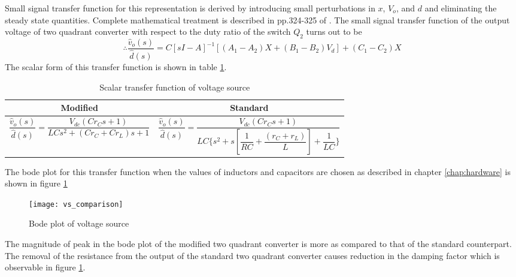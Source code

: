 	Small signal transfer function for this representation is derived by introducing small perturbations in $x$, $V_o$, and $d$ and eliminating the steady state quantities. Complete mathematical treatment is described in pp.324-325 of \citet{book:768263}. The small signal transfer function of the output voltage of two quadrant converter with respect to the duty ratio of the switch $Q_2$ turns out to be \cite{book:768263}
	\begin{equation}
		\therefore \dfrac{\hat{v}_o(s)}{\hat{d}(s)} = C[sI-A]^{-1}[(A_1-A_2)X+(B_1-B_2)V_d]+(C_1-C_2)X
		\label{eq:mod27a}
	\end{equation}
	The scalar form of this transfer function is shown in table \ref{tab:vstf}.
	\begin{table}[h]
	\centering
	\begin{tabular}{|p{6cm}|p{8cm}|} \hline
	\multicolumn{1}{|c|}{Modified} & \multicolumn{1}{c|}{Standard} \\ \hline
	\vspace{-2mm} \(\displaystyle \dfrac{\hat{v}_o(s)}{\hat{d}(s)} = \dfrac{V_{dc}(Cr_Cs+1)}{LCs^2+(Cr_C+Cr_L)s+1} \) & \vspace{-2mm} \(\displaystyle \dfrac{\hat{v}_o(s)}{\hat{d}(s)} = \dfrac{V_{dc}(Cr_Cs+1)}{LC\{s^2+s\left[\dfrac{1}{RC} + \dfrac{(r_C + r_L)}{L} \right]+\dfrac{1}{LC}\}}\) \vspace{1mm} \\ \hline
	\end{tabular}
	\caption{Scalar transfer function of voltage source}
	\label{tab:vstf}
	\end{table}
	
	The bode plot for this transfer function when the values of inductors and capacitors are chosen as described in chapter \ref{chap:hardware} is shown in figure \ref{fig:uncomp-vs}
	\begin{comment}
		\begin{figure}[h]
			\centering
			\texttt{[image: uncompensated-vs]}
			\caption{Bode plot of uncompensated transfer function of voltage source; Gm = $\infty$,  Pm = 0.0166$^\circ$ (at 2.85e+05 rad/s)}
			\label{fig:uncomp-vs}
		\end{figure}
	\end{comment}
	\begin{figure}[H]
		\centering
		\texttt{[image: vs\_comparison]}
		\caption{Bode plot of voltage source}
		\label{fig:uncomp-vs}
	\end{figure}
	The magnitude of peak in the bode plot of the modified two quadrant converter is more as compared to that of the standard counterpart. The removal of the resistance from the output of the standard two quadrant converter causes reduction in the damping factor which is observable in figure \ref{fig:uncomp-vs}.

